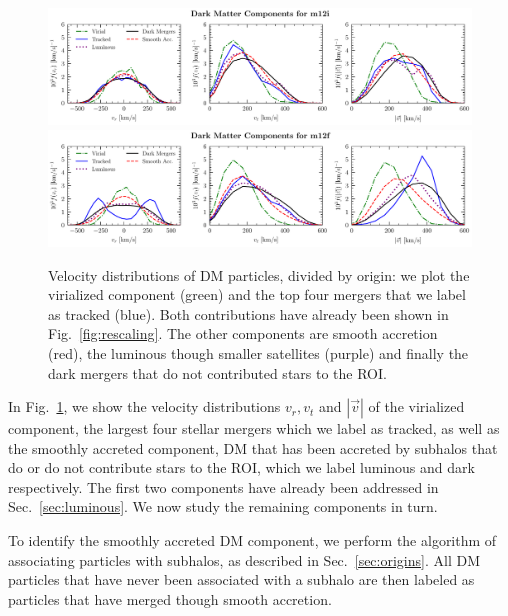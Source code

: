 \documentclass[twocolumn,preprintnumbers]{aastex6}
\DeclareRobustCommand{\Sec}[1]{Sec.~\ref{#1}}
\DeclareRobustCommand{\Fig}[1]{Fig.~\ref{#1}}
\begin{document}
\begin{figure}[tb] %
   \centering
	\includegraphics[width=7in]{plots/untracked_compoenents_m12i.pdf}
	\includegraphics[width=7in]{plots/untracked_compoenents_m12f.pdf} 
   \caption{Velocity distributions of DM particles, divided by origin: we plot the virialized component (green) and the top four mergers that we label as tracked (blue). Both contributions have already been shown in \Fig{fig:rescaling}. The other components are smooth accretion (red), the luminous though smaller satellites (purple) and finally the dark mergers that do not contributed stars to the ROI.}
   \label{fig:unvirialized}
\end{figure}


In \Fig{fig:unvirialized}, we show the velocity distributions $v_r, v_t$ and $|\vec{v}|$ of the virialized component, the largest four stellar mergers which we label as tracked, as well as the smoothly accreted component, DM that has been accreted by subhalos that do or do not contribute stars to the ROI, which we label luminous and dark respectively. The first two components have already been addressed in \Sec{sec:luminous}. We now study the remaining components in turn.

To identify the smoothly accreted DM component, we perform the algorithm of associating particles with subhalos, as described in \Sec{sec:origins}. All DM particles that have never been associated with a subhalo are then labeled as particles that have merged though smooth accretion. 
\end{document}
